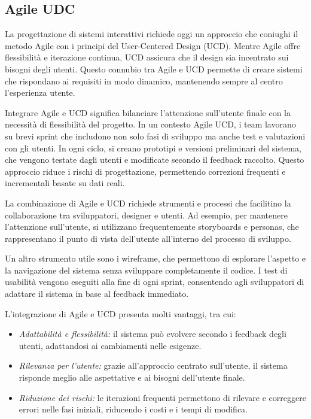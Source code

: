 \subsection{Agile UDC}
La progettazione di sistemi interattivi richiede oggi un approccio che coniughi il metodo Agile con i principi del User-Centered Design (UCD). Mentre Agile offre flessibilità e iterazione continua, UCD assicura che il design sia incentrato sui bisogni degli utenti. Questo connubio tra Agile e UCD permette di creare sistemi che rispondano ai requisiti in modo dinamico, mantenendo sempre al centro l'esperienza utente.

Integrare Agile e UCD significa bilanciare l’attenzione sull’utente finale con la necessità di flessibilità del progetto. In un contesto Agile UCD, i team lavorano su brevi sprint che includono non solo fasi di sviluppo ma anche test e valutazioni con gli utenti. In ogni ciclo, si creano prototipi e versioni preliminari del sistema, che vengono testate dagli utenti e modificate secondo il feedback raccolto. Questo approccio riduce i rischi di progettazione, permettendo correzioni frequenti e incrementali basate su dati reali.

La combinazione di Agile e UCD richiede strumenti e processi che facilitino la collaborazione tra sviluppatori, designer e utenti. Ad esempio, per mantenere l’attenzione sull’utente, si utilizzano frequentemente storyboards e personas, che rappresentano il punto di vista dell'utente all'interno del processo di sviluppo.

Un altro strumento utile sono i wireframe, che permettono di esplorare l’aspetto e la navigazione del sistema senza sviluppare completamente il codice. I test di usabilità vengono eseguiti alla fine di ogni sprint, consentendo agli sviluppatori di adattare il sistema in base al feedback immediato.

L’integrazione di Agile e UCD presenta molti vantaggi, tra cui:
\begin{itemize}
    \item \textit{Adattabilità e flessibilità:} il sistema può evolvere secondo i feedback degli utenti, adattandosi ai cambiamenti nelle esigenze.
    \item \textit{Rilevanza per l'utente:} grazie all'approccio centrato sull'utente, il sistema risponde meglio alle aspettative e ai bisogni dell'utente finale.
    \item \textit{Riduzione dei rischi:} le iterazioni frequenti permettono di rilevare e correggere errori nelle fasi iniziali, riducendo i costi e i tempi di modifica.
\end{itemize}

